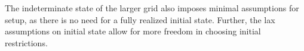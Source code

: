 
The indeterminate state of the larger grid also imposes minimal assumptions for setup,
as there is no need for a fully realized initial state.
Further, the lax assumptions on initial state allow for more freedom
in choosing initial restrictions.


